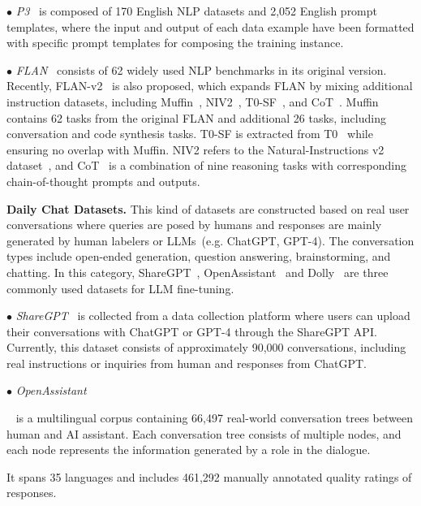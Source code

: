 $\bullet$ \emph{P3}~\cite{Sanh-2022-ICLR-P3} is composed of 170 English NLP datasets and 2,052 English prompt templates, where the input and output of each data example have been formatted with specific prompt templates for composing the training instance.

$\bullet$ \emph{FLAN}{~\cite{Wei-ICLR-2022-Finetuned} consists of 62 widely used NLP benchmarks in its original version. Recently, FLAN-v2~\cite{Longpre-2023-arxiv-Flan_v2} is also proposed, which expands FLAN by mixing additional instruction datasets, including  Muffin~\cite{Wei-ICLR-2022-Finetuned}, NIV2~\cite{Wang-EMNLP-2022-Super}, T0-SF~\cite{Sanh-ICLR-2022-Multitask}, and CoT~\cite{Cobbe-arxiv-2021-Training, Geva-tacl-2021-Did, Camburu-2020-ACL-Make}. Muffin contains 62 tasks from the original FLAN and additional 26 tasks, including conversation and code synthesis tasks. T0-SF is extracted from T0~\cite{Sanh-ICLR-2022-Multitask} while ensuring no overlap with Muffin. NIV2 refers to the Natural-Instructions v2 dataset~\cite{Wang-EMNLP-2022-Super}, and CoT~\cite{Cobbe-arxiv-2021-Training, Geva-tacl-2021-Did, Camburu-2020-ACL-Make} is a combination of nine reasoning tasks with corresponding chain-of-thought prompts and outputs. }

\textbf{Daily Chat Datasets.} {This kind of datasets are constructed based on real user conversations where queries are posed by humans and responses are mainly  generated by human labelers or LLMs~(e.g. ChatGPT, GPT-4). The conversation types include open-ended generation, question answering, brainstorming, and chatting. In this category,  ShareGPT~\cite{ShareGPT}, OpenAssistant~\cite{kopf-arxiv-2023-openassistant} and Dolly~\cite{Conover-2023-arxiv-Dolly} are three commonly used datasets for LLM fine-tuning.}

$\bullet$ \emph{ShareGPT}{~\cite{ShareGPT} is collected from a data collection platform where users can upload their conversations with ChatGPT or GPT-4 through the ShareGPT API. Currently, this dataset consists of approximately 90,000 conversations, including real instructions or inquiries from human and responses from ChatGPT.} 

$\bullet$ \emph{OpenAssistant}{~\cite{kopf-arxiv-2023-openassistant} is a multilingual corpus containing 66,497 real-world conversation trees between human and AI assistant. Each conversation tree consists of multiple nodes, and each node represents the information generated by a role in the dialogue.

It spans 35 languages and includes 461,292 manually annotated quality ratings of responses. }

